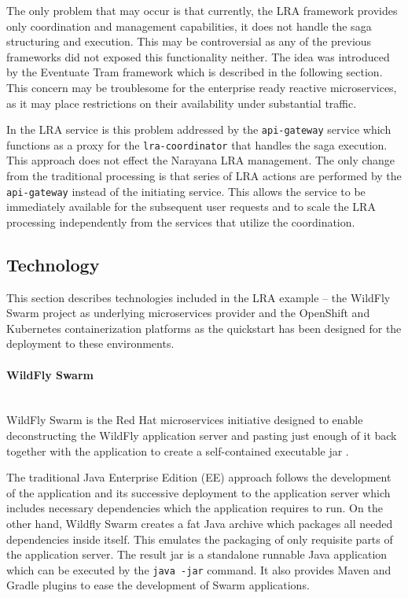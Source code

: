 \documentclass[oneside,
  digital, %
  table,   %
  nolof,     %
  nolot,     %
]{fithesis3}
\newcommand{\newlinepar}[1]{\paragraph{#1}\needspace{4\baselineskip}\mbox{}\\}
\begin{document}
The only problem that may occur is that currently, the LRA framework provides only coordination and management capabilities, it does not handle the saga structuring and execution. This may be controversial as any of the previous frameworks did not exposed this functionality neither. The idea was introduced by the Eventuate Tram framework which is described in the following section. This concern may be troublesome for the enterprise ready reactive microservices, as it may place restrictions on their availability under substantial traffic. 

In the LRA service is this problem addressed by the \texttt{api-gateway} service which functions as a proxy for the \texttt{lra-coordinator} that handles the saga execution. This approach does not effect the Narayana LRA management. The only change from the traditional processing is that series of LRA actions are performed by the \texttt{api-gateway} instead of the initiating service. This allows the service to be immediately available for the subsequent user requests and to scale the LRA processing independently from the services that utilize the coordination.

\subsection{Technology}

This section describes technologies included in the LRA example -- the WildFly Swarm project as underlying microservices provider and the OpenShift and Kubernetes containerization platforms as the quickstart has been designed for the deployment to these environments.

\newlinepar{WildFly Swarm}

WildFly Swarm is the Red Hat microservices initiative designed to enable deconstructing the WildFly application server and pasting just enough of it back together with the application to create a self-contained executable jar \cite{gupta_2018}. 

The traditional Java Enterprise Edition (EE) approach follows the development of the application and its successive deployment to the application server which includes necessary dependencies which the application requires to run. On the other hand, Wildfly Swarm creates a fat Java archive which packages all needed dependencies inside itself. This emulates the packaging of only requisite parts of the application server. The result jar is a standalone runnable Java application which can be executed by the \texttt{java -jar} command. It also provides Maven and Gradle plugins to ease the development of Swarm applications.
\end{document}
